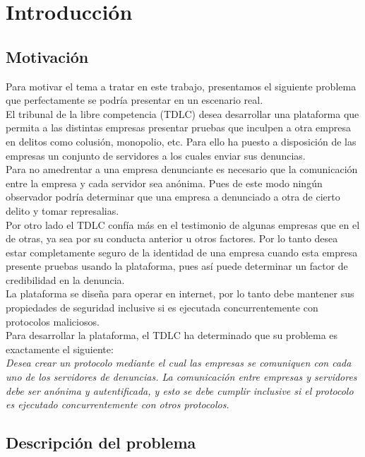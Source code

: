 \chapter{Introducción}

\section{Motivación}
Para motivar el tema a tratar en este trabajo, presentamos el siguiente problema que
perfectamente se podría presentar en un escenario real.\\
El tribunal de la libre competencia (TDLC) desea desarrollar una plataforma que permita
a las distintas empresas presentar pruebas que inculpen
a otra empresa en delitos como colusión, monopolio, etc. Para ello ha puesto
a disposición de las empresas un conjunto de servidores a los cuales enviar sus denuncias.\\
Para no amedrentar a una empresa
denunciante  es necesario que la comunicación entre la empresa y cada servidor
sea anónima. Pues de este modo ningún observador podría determinar que una empresa a denunciado
a otra de cierto delito y tomar represalias.\\
Por otro lado el TDLC confía más en el testimonio de algunas empresas que en el de otras, ya sea por
su conducta anterior u otros factores. Por lo tanto desea estar completamente seguro de la identidad
de una empresa cuando esta empresa presente pruebas usando la plataforma, pues así puede determinar
un factor de credibilidad en la denuncia.\\
La plataforma se diseña para operar en internet, por lo tanto debe mantener sus propiedades
de seguridad inclusive si es ejecutada concurrentemente con protocolos maliciosos.\\
Para desarrollar la plataforma, el TDLC ha determinado que su problema es exactamente el siguiente:\\
\textit{Desea crear un protocolo mediante el cual las empresas se comuniquen con cada uno de los servidores
de denuncias. La comunicación entre empresas y servidores debe ser anónima y autentificada, y esto se
debe cumplir inclusive si el protocolo es ejecutado concurrentemente con otros protocolos.}\\ 

\section{Descripción del problema}

